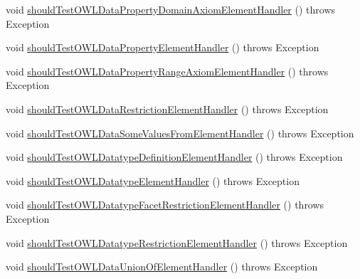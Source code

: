 \begin{DoxyCompactItemize}
void \hyperlink{classorg_1_1semanticweb_1_1owlapi_1_1contract_1_1_contract_owlxmlparser_test_a7dca00e174835e74c0d9c1eb5bd6d07f}{should\-Test\-O\-W\-L\-Data\-Property\-Domain\-Axiom\-Element\-Handler} ()  throws Exception 
\item 
void \hyperlink{classorg_1_1semanticweb_1_1owlapi_1_1contract_1_1_contract_owlxmlparser_test_a724ec03c5a5e98580fad783a975e27ee}{should\-Test\-O\-W\-L\-Data\-Property\-Element\-Handler} ()  throws Exception 
\item 
void \hyperlink{classorg_1_1semanticweb_1_1owlapi_1_1contract_1_1_contract_owlxmlparser_test_a4e44c023b1627c89837647e52e6adb69}{should\-Test\-O\-W\-L\-Data\-Property\-Range\-Axiom\-Element\-Handler} ()  throws Exception 
\item 
void \hyperlink{classorg_1_1semanticweb_1_1owlapi_1_1contract_1_1_contract_owlxmlparser_test_a9d138d2500a72f189b3104aef1c0f557}{should\-Test\-O\-W\-L\-Data\-Restriction\-Element\-Handler} ()  throws Exception 
\item 
void \hyperlink{classorg_1_1semanticweb_1_1owlapi_1_1contract_1_1_contract_owlxmlparser_test_ae67c6e0616b6893bd65704de5fba0954}{should\-Test\-O\-W\-L\-Data\-Some\-Values\-From\-Element\-Handler} ()  throws Exception 
\item 
void \hyperlink{classorg_1_1semanticweb_1_1owlapi_1_1contract_1_1_contract_owlxmlparser_test_ae3e6e5f059ddb8f531766e74ea397df7}{should\-Test\-O\-W\-L\-Datatype\-Definition\-Element\-Handler} ()  throws Exception 
\item 
void \hyperlink{classorg_1_1semanticweb_1_1owlapi_1_1contract_1_1_contract_owlxmlparser_test_a8264f0ac3421b425f60a89d661e13740}{should\-Test\-O\-W\-L\-Datatype\-Element\-Handler} ()  throws Exception 
\item 
void \hyperlink{classorg_1_1semanticweb_1_1owlapi_1_1contract_1_1_contract_owlxmlparser_test_a9a82610edee1b86a1f29ef5315b2066a}{should\-Test\-O\-W\-L\-Datatype\-Facet\-Restriction\-Element\-Handler} ()  throws Exception 
\item 
void \hyperlink{classorg_1_1semanticweb_1_1owlapi_1_1contract_1_1_contract_owlxmlparser_test_a28bfca658e5910da57ed771f58f817ee}{should\-Test\-O\-W\-L\-Datatype\-Restriction\-Element\-Handler} ()  throws Exception 
\item 
void \hyperlink{classorg_1_1semanticweb_1_1owlapi_1_1contract_1_1_contract_owlxmlparser_test_aab550acd675e9fb7b3a0a68a794a7eb3}{should\-Test\-O\-W\-L\-Data\-Union\-Of\-Element\-Handler} ()  throws Exception 
\item 

\end{DoxyCompactItemize}
